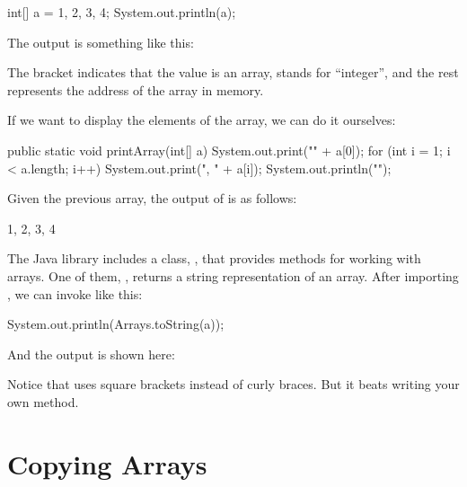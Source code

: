 \begin{code}
int[] a = {1, 2, 3, 4};
System.out.println(a);
\end{code}

The output is something like this:

\begin{stdout}
[I@bf3f7e0
\end{stdout}

The bracket indicates that the value is an array,  stands for ``integer'', and the rest represents the address of the array in memory.

If we want to display the elements of the array, we can do it ourselves:


\begin{code}
public static void printArray(int[] a) {
    System.out.print("{" + a[0]);
    for (int i = 1; i < a.length; i++) {
        System.out.print(", " + a[i]);
    }
    System.out.println("}");
}
\end{code}

Given the previous array, the output of  is as follows:

\begin{stdout}
{1, 2, 3, 4}
\end{stdout}


The Java library includes a class, , that provides methods for working with arrays.
One of them, , returns a string representation of an array.
After importing , we can invoke  like this:

\begin{code}
System.out.println(Arrays.toString(a));
\end{code}

And the output is shown here:

\begin{stdout}
[1, 2, 3, 4]
\end{stdout}

Notice that  uses square brackets instead of curly braces.
But it beats writing your own  method.


\section{Copying Arrays}

